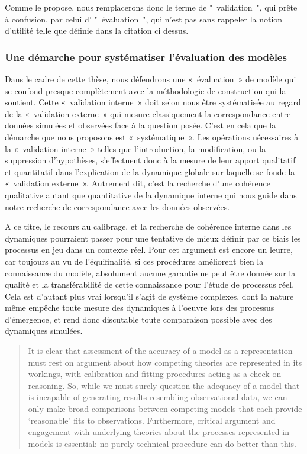 Comme  le propose, nous remplacerons donc le terme de " validation ", qui prête à confusion,  par celui d’ " évaluation ", qui n'est pas sans rappeler la notion d'utilité telle que définie dans la citation ci dessus.

\subsubsection{Une démarche pour systématiser l'évaluation des modèles}

Dans le cadre de cette thèse, nous défendrons une « évaluation » de modèle qui se confond presque complètement avec la méthodologie de construction qui la soutient. Cette « validation interne » doit selon nous être systématisée au regard de la « validation externe » qui mesure classiquement la correspondance entre données simulées et observées face à la question posée. C’est en cela que la démarche que nous proposons est « systématique ». Les opérations nécessaires à la « validation interne » telles que l'introduction, la modification, ou la suppression d'hypothèses, s’effectuent donc à la mesure de leur apport qualitatif et quantitatif dans l'explication de la dynamique globale sur laquelle se fonde la « validation externe ». Autrement dit, c'est la recherche d'une cohérence qualitative autant que quantitative de la dynamique interne qui nous guide dans notre recherche de correspondance avec les données observées.

A ce titre, le recours au calibrage, et la recherche de cohérence interne dans les dynamiques pourraient passer pour une tentative de mieux définir par ce biais les processus en jeu dans un contexte réel. Pour \autocite{OSullivan2004} cet argument est encore un leurre, car toujours au vu de l'équifinalité, si ces procédures améliorent bien la connaissance du modèle, absolument aucune garantie ne peut être donnée sur la qualité et la transférabilité de cette connaissance pour l'étude de processus réel. Cela est d'autant plus vrai lorsqu'il s'agit de système complexes, dont la nature même empêche toute  mesure des dynamiques à l'oeuvre lors des processus d'émergence, et rend donc discutable toute comparaison possible avec des dynamiques simulées. 

\begin{quotation} It is clear that assessment of the accuracy of a model as a representation must rest on argument about how competing theories are represented in its workings, with calibration and fitting procedures acting as a check on reasoning. So, while we must surely question the adequacy of a model that is incapable of generating results resembling observational data, we can only make broad comparisons between competing models that each provide ‘reasonable’ fits to observations. Furthermore, critical argument and engagement with underlying theories about the processes represented in models is essential: no purely technical procedure can do better than this.  \\  \end{quotation}

